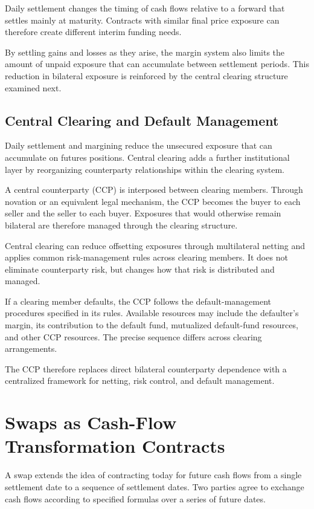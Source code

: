 Daily settlement changes the timing of cash flows relative to a forward that settles mainly at maturity. Contracts with similar final price exposure can therefore create different interim funding needs.

By settling gains and losses as they arise, the margin system also limits the amount of unpaid exposure that can accumulate between settlement periods. This reduction in bilateral exposure is reinforced by the central clearing structure examined next.

\subsection{Central Clearing and Default Management}

Daily settlement and margining reduce the unsecured exposure that can accumulate on futures positions. Central clearing adds a further institutional layer by reorganizing counterparty relationships within the clearing system.

A central counterparty (CCP) is interposed between clearing members. Through novation or an equivalent legal mechanism, the CCP becomes the buyer to each seller and the seller to each buyer. Exposures that would otherwise remain bilateral are therefore managed through the clearing structure.

Central clearing can reduce offsetting exposures through multilateral netting and applies common risk-management rules across clearing members. It does not eliminate counterparty risk, but changes how that risk is distributed and managed.

If a clearing member defaults, the CCP follows the default-management procedures specified in its rules. Available resources may include the defaulter's margin, its contribution to the default fund, mutualized default-fund resources, and other CCP resources. The precise sequence differs across clearing arrangements.

The CCP therefore replaces direct bilateral counterparty dependence with a centralized framework for netting, risk control, and default management.


\section{Swaps as Cash-Flow Transformation Contracts}

A swap extends the idea of contracting today for future cash flows from a single settlement date to a sequence of settlement dates. Two parties agree to exchange cash flows according to specified formulas over a series of future dates.

